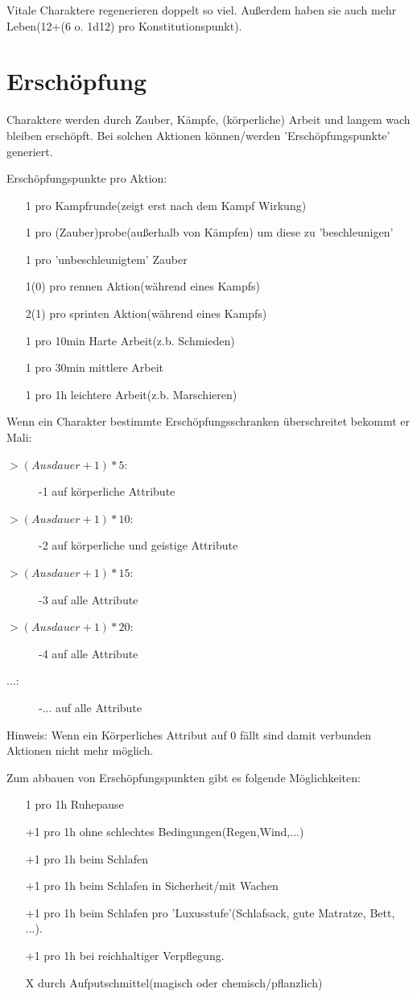 Vitale Charaktere regenerieren doppelt so viel. Außerdem haben sie auch mehr Leben(12+(6 o. 1d12) pro Konstitutionspunkt).

\section{Erschöpfung}

Charaktere werden durch Zauber, Kämpfe, (körperliche) Arbeit und langem wach bleiben erschöpft. Bei solchen Aktionen können/werden 'Erschöpfungspunkte' generiert.

Erschöpfungspunkte pro Aktion:
\begin{itemize}
\item[1] pro Kampfrunde(zeigt erst nach dem Kampf Wirkung)
\item[1] pro (Zauber)probe(außerhalb von Kämpfen) um diese zu 'beschleunigen'
\item[1] pro 'unbeschleunigtem' Zauber
\item[1(0)] pro rennen Aktion(während eines Kampfs)
\item[2(1)] pro sprinten Aktion(während eines Kampfs)
\item[1] pro 10min Harte Arbeit(z.b. Schmieden)
\item[1] pro 30min mittlere Arbeit
\item[1] pro 1h leichtere Arbeit(z.b. Marschieren)
\end{itemize}

Wenn ein Charakter bestimmte Erschöpfungsschranken überschreitet bekommt er Mali:
\begin{description}
\item[$>(Ausdauer+1)*5$:] -1 auf körperliche Attribute
\item[$>(Ausdauer+1)*10$:] -2 auf körperliche und geistige Attribute
\item[$>(Ausdauer+1)*15$:] -3 auf alle Attribute
\item[$>(Ausdauer+1)*20$:] -4 auf alle Attribute
\item[...:] -... auf alle Attribute
\end{description}
Hinweis: Wenn ein Körperliches Attribut auf 0 fällt sind damit verbunden Aktionen nicht mehr möglich.

Zum abbauen von Erschöpfungspunkten gibt es folgende Möglichkeiten:
\begin{itemize}
\item[1] pro 1h Ruhepause
\item[+1] pro 1h ohne schlechtes Bedingungen(Regen,Wind,...)
\item[+1] pro 1h beim Schlafen
\item[+1] pro 1h beim Schlafen in Sicherheit/mit Wachen
\item[+1] pro 1h beim Schlafen pro 'Luxusstufe'(Schlafsack, gute Matratze, Bett, ...).
\item[+1] pro 1h bei reichhaltiger Verpflegung.
\item[X] durch Aufputschmittel(magisch oder chemisch/pflanzlich)
\end{itemize}

